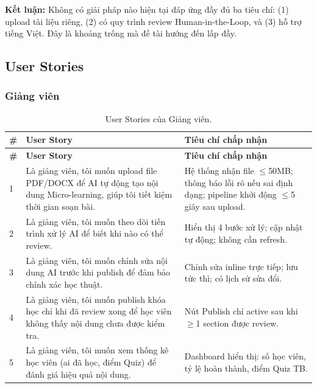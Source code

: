 \noindent\textbf{Kết luận:} Không có giải pháp nào hiện tại đáp ứng đầy đủ
ba tiêu chí: (1) upload tài liệu riêng, (2) có quy trình review Human-in-the-Loop,
và (3) hỗ trợ tiếng Việt. Đây là khoảng trống mà đề tài hướng đến lấp đầy.

\subsection{User Stories}

\subsubsection{Giảng viên}

\begin{longtable}{|p{0.5cm}|p{6cm}|p{8cm}|}
    \caption{User Stories của Giảng viên.} \label{tab:us-instructor} \\
    \hline
    \textbf{\#} & \textbf{User Story} & \textbf{Tiêu chí chấp nhận} \\
    \hline
    \endfirsthead \hline
    \textbf{\#} & \textbf{User Story} & \textbf{Tiêu chí chấp nhận} \\
    \hline \endhead

    1 & Là giảng viên, tôi muốn upload file PDF/DOCX để AI tự động tạo nội
        dung Micro-learning, giúp tôi tiết kiệm thời gian soạn bài. &
        Hệ thống nhận file $\leq$50MB; thông báo lỗi rõ nếu sai định dạng;
        pipeline khởi động $\leq$5 giây sau upload. \\ \hline

    2 & Là giảng viên, tôi muốn theo dõi tiến trình xử lý AI để biết khi
        nào có thể review. &
        Hiển thị 4 bước xử lý; cập nhật tự động; không cần refresh. \\ \hline

    3 & Là giảng viên, tôi muốn chỉnh sửa nội dung AI trước khi publish để
        đảm bảo chính xác học thuật. &
        Chỉnh sửa inline trực tiếp; lưu tức thì; có lịch sử sửa đổi. \\ \hline

    4 & Là giảng viên, tôi muốn publish khóa học chỉ khi đã review xong để
        học viên không thấy nội dung chưa được kiểm tra. &
        Nút Publish chỉ active sau khi $\geq$1 section được review. \\ \hline

    5 & Là giảng viên, tôi muốn xem thống kê học viên (ai đã học, điểm Quiz)
        để đánh giá hiệu quả nội dung. &
        Dashboard hiển thị: số học viên, tỷ lệ hoàn thành, điểm Quiz TB. \\ \hline
\end{longtable}


